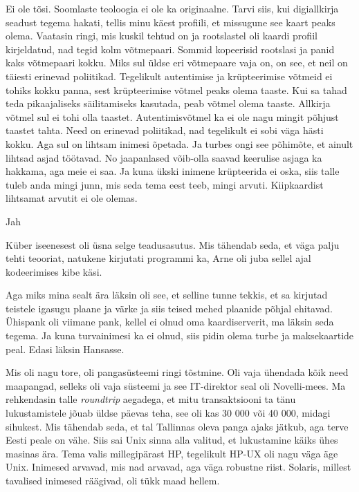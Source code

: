 Ei ole tõsi. Soomlaste teoloogia ei ole ka originaalne. Tarvi siis, kui  digiallkirja seadust tegema hakati, tellis minu käest profiili, et missugune see kaart peaks olema. Vaatasin ringi, mis kuskil tehtud on ja rootslastel oli kaardi profiil kirjeldatud, nad tegid kolm võtmepaari. Sommid kopeerisid rootslasi ja panid kaks võtmepaari kokku. Miks sul üldse eri võtmepaare vaja on, on see, et neil on täiesti erinevad poliitikad. Tegelikult autentimise ja krüpteerimise võtmeid ei tohiks kokku panna, sest krüpteerimise võtmel  peaks olema taaste. Kui sa tahad teda pikaajaliseks säilitamiseks kasutada, peab võtmel  olema taaste. Allkirja võtmel sul ei tohi olla taastet. Autentimisvõtmel ka ei ole nagu mingit põhjust taastet tahta. Need on erinevad poliitikad, nad tegelikult ei sobi väga hästi kokku. Aga sul on lihtsam inimesi õpetada. Ja turbes ongi see põhimõte, et ainult lihtsad asjad töötavad. No jaapanlased võib-olla saavad keerulise asjaga ka hakkama, aga meie ei saa. Ja kuna ükski inimene krüpteerida ei oska, siis talle tuleb anda mingi junn, mis seda tema eest teeb, mingi arvuti. Kiipkaardist lihtsamat arvutit ei ole olemas.
     

Jah

            
Küber iseenesest oli üsna selge teadusasutus. Mis tähendab seda, et väga palju tehti teooriat, natukene kirjutati programmi ka, Arne oli juba sellel ajal kodeerimises kibe käsi.

Aga miks mina sealt ära läksin oli see, et selline tunne tekkis, et sa kirjutad teistele igasugu plaane ja värke ja siis teised mehed plaanide põhjal ehitavad. Ühispank oli viimane pank, kellel ei olnud oma kaardiserverit, ma läksin seda tegema. Ja kuna turvainimesi ka ei olnud, siis pidin olema turbe ja maksekaartide peal. Edasi läksin Hansasse. 

Mis oli nagu tore, oli pangasüsteemi ringi tõstmine. Oli vaja ühendada kõik need maapangad, selleks oli vaja süsteemi ja see IT-direktor seal oli Novelli-mees. Ma rehkendasin talle \emph{roundtrip} aegadega, et mitu transaktsiooni ta tänu lukustamistele jõuab üldse päevas teha, see oli kas 30 000 või 40 000, midagi sihukest. Mis tähendab seda, et tal Tallinnas oleva panga ajaks jätkub, aga terve Eesti peale on vähe. Siis sai Unix sinna alla valitud, et lukustamine käiks ühes masinas ära. Tema valis millegipärast HP, tegelikult HP-UX oli nagu väga äge Unix. Inimesed arvavad, mis nad arvavad, aga väga robustne riist. Solaris, millest tavalised inimesed räägivad, oli tükk maad hellem. 

